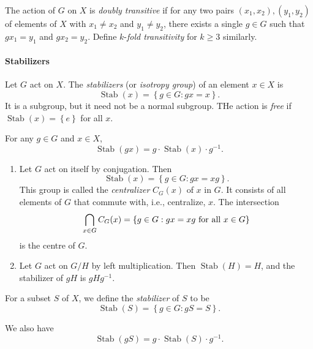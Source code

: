\begin{definition}
  The action of \( G \) on \( X \) is \emph{doubly transitive} if for any two pairs \( (x_1, x_2), (y_1, y_2) \) of elements of \( X \) with \( x_1 \neq x_2 \) and \( y_1 \neq y_2 \), there exists a single \( g \in G \) such that \( gx_1 = y_1 \) and \( gx_2 = y_2 \).
  Define \( k \)-\emph{fold transitivity} for \( k \geq 3 \) similarly.
\end{definition}

\paragraph{Stabilizers}

\begin{definition}
  Let \( G \) act on \( X \).
  The \emph{stabilizers} (or \emph{isotropy group}) of an element \( x \in X \) is
  \[
    \operatorname{Stab}(x) = \left\lbrace g \in G: gx = x \right\rbrace.
  \]
  It is a subgroup, but it need not be a normal subgroup.
  THe action is \emph{free} if \( \operatorname{Stab}(x) = \left\lbrace e \right\rbrace \) for all \( x \).
\end{definition}

\begin{lemma}
  For any \( g \in G \) and \( x \in X \),
  \[
    \operatorname{Stab}(gx) = g \cdot \operatorname{Stab}(x) \cdot g^{-1}.
  \]
\end{lemma}

\begin{example}
  \begin{enumerate}
    \item Let \( G \) act on itself by conjugation.
      Then
      \[
        \operatorname{Stab}(x) = \left\lbrace g \in G: gx = xg \right\rbrace.
      \]
      This group is called the \emph{centralizer} \( C_G(x) \) of \( x \) in \( G \).
      It consists of all elements of \( G \) that commute with, i.e., centralize, \( x \).
      The intersection
      \[
        \bigcap_{x \in G} C_G(x) = \left\lbrace g \in G: gx = xg \textmd{ for all } x \in G \right\rbrace
      \]
      is the centre of \( G \).
    \item Let \( G \) act on \( G / H \) by left multiplication.
      Then \( \operatorname{Stab}(H) = H \), and the stabilizer of \( gH \) is \( gHg^{-1} \).
  \end{enumerate}
\end{example}

\begin{definition}
  For a subset \( S \) of \( X \), we define the \emph{stabilizer} of \( S \) to be
  \[
    \operatorname{Stab}(S) = \left\lbrace g \in G: gS = S \right\rbrace.
  \]
\end{definition}
We also have
\[
    \operatorname{Stab}(gS) = g \cdot \operatorname{Stab}(S) \cdot g^{-1}.
\]


